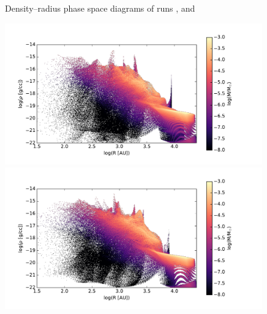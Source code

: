 \begin{figure}[!htb]
 \captionsetup{justification=justified,singlelinecheck=false,width=\linewidth}
 \decoRule
 \caption[ $\rho$--R phase diagrams]{Density--radius phase space diagrams of runs ,  and }
\label{fig:c0.1_r_R_larson}
\end{figure}
\FloatBarrier

\begin{figure}[!htb]
 \centering
 \includegraphics[width=0.99\textwidth]{Figures/var_rt_larson_plots/rho_R_hist_n100c1}
 \includegraphics[width=0.99\textwidth]{Figures/var_rt_larson_plots/rho_R_hist_n10c1}

\end{figure}
